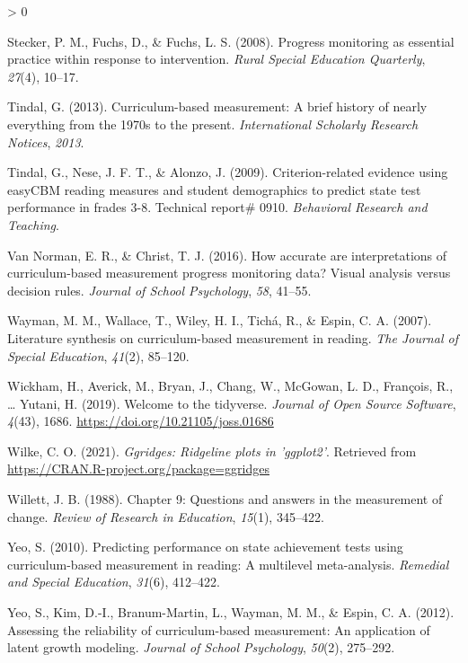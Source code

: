 \documentclass[
  english,
  man, fleqn, noextraspace]{apa6}
\newlength{\cslhangindent}
\newenvironment{CSLReferences}[2] %
 {%
  \setlength{\parindent}{0pt}
  \ifodd #1 \everypar{\setlength{\hangindent}{\cslhangindent}}\ignorespaces\fi
  \ifnum #2 > 0
  \setlength{\parskip}{#2\baselineskip}
  \fi
 }%
 {}
\begin{document}
\begin{CSLReferences}{1}{0}
\leavevmode\hypertarget{ref-stecker2008}{}%
Stecker, P. M., Fuchs, D., \& Fuchs, L. S. (2008). Progress monitoring as essential practice within response to intervention. \emph{Rural Special Education Quarterly}, \emph{27}(4), 10--17.

\leavevmode\hypertarget{ref-tindal2013}{}%
Tindal, G. (2013). Curriculum-based measurement: A brief history of nearly everything from the 1970s to the present. \emph{International Scholarly Research Notices}, \emph{2013}.

\leavevmode\hypertarget{ref-tindal2009}{}%
Tindal, G., Nese, J. F. T., \& Alonzo, J. (2009). Criterion-related evidence using easyCBM reading measures and student demographics to predict state test performance in frades 3-8. Technical report\# 0910. \emph{Behavioral Research and Teaching}.

\leavevmode\hypertarget{ref-vannorman2016}{}%
Van Norman, E. R., \& Christ, T. J. (2016). How accurate are interpretations of curriculum-based measurement progress monitoring data? Visual analysis versus decision rules. \emph{Journal of School Psychology}, \emph{58}, 41--55.

\leavevmode\hypertarget{ref-wayman2007}{}%
Wayman, M. M., Wallace, T., Wiley, H. I., Tichá, R., \& Espin, C. A. (2007). Literature synthesis on curriculum-based measurement in reading. \emph{The Journal of Special Education}, \emph{41}(2), 85--120.

\leavevmode\hypertarget{ref-R-tidyverse}{}%
Wickham, H., Averick, M., Bryan, J., Chang, W., McGowan, L. D., François, R., \ldots{} Yutani, H. (2019). Welcome to the {tidyverse}. \emph{Journal of Open Source Software}, \emph{4}(43), 1686. \url{https://doi.org/10.21105/joss.01686}

\leavevmode\hypertarget{ref-R-ggridges}{}%
Wilke, C. O. (2021). \emph{Ggridges: Ridgeline plots in 'ggplot2'}. Retrieved from \url{https://CRAN.R-project.org/package=ggridges}

\leavevmode\hypertarget{ref-willett1988chapter}{}%
Willett, J. B. (1988). Chapter 9: Questions and answers in the measurement of change. \emph{Review of Research in Education}, \emph{15}(1), 345--422.

\leavevmode\hypertarget{ref-yeo2010}{}%
Yeo, S. (2010). Predicting performance on state achievement tests using curriculum-based measurement in reading: A multilevel meta-analysis. \emph{Remedial and Special Education}, \emph{31}(6), 412--422.

\leavevmode\hypertarget{ref-yeoetal2012}{}%
Yeo, S., Kim, D.-I., Branum-Martin, L., Wayman, M. M., \& Espin, C. A. (2012). Assessing the reliability of curriculum-based measurement: An application of latent growth modeling. \emph{Journal of School Psychology}, \emph{50}(2), 275--292.

\end{CSLReferences}
\end{document}
